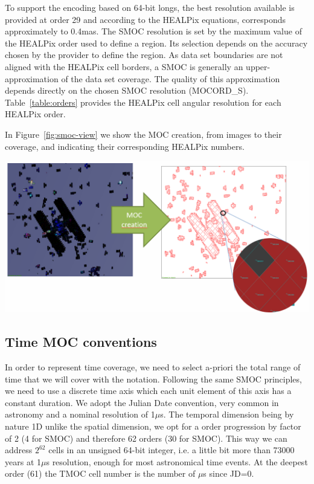 \documentclass[11pt,a4paper]{ivoa}
\begin{document}
To support the encoding based on 64-bit longs, the best resolution
available is provided at order 29 and according to the HEALPix
equations, corresponds approximately to 0.4mas.  The SMOC resolution
is set by the maximum value of the HEALPix order used to define a
region. Its selection depends on the accuracy chosen by the provider
to define the region.  As data set boundaries are not aligned with the
HEALPix cell borders, a SMOC is generally an upper-approximation of
the data set coverage. The quality of this approximation depends
directly on the chosen SMOC resolution (MOCORD\_S).
Table~\ref{table:orders} provides the HEALPix cell angular resolution for
each HEALPix order.

In Figure~\ref{fig:smoc-view} we show the MOC creation, from images to their coverage,
and indicating their corresponding HEALPix numbers. 

\begin{adjustbox}{center,caption={SMOC: from the image
      to the list of numbers based on HEALPix hierarchy tessellation},
    label={fig:smoc-view},nofloat=figure,vspace=\bigskipamount}
\includegraphics[width=\textwidth]{smoc_view.png}
\end{adjustbox}




\subsection{Time MOC conventions}
\label{sec:tmoc1}


In order to represent time coverage, we need to select a-priori the
total range of time that we will cover with the notation. Following
the same SMOC principles, we need to use a discrete time axis which
each unit element of this axis has a constant duration. We adopt
the Julian Date convention, very common in astronomy and a nominal
resolution of 1$\mu$s. The temporal dimension being by nature 1D unlike
the spatial dimension, we opt for a order progression by factor of
2 (4 for SMOC) and therefore 62 orders (30 for SMOC). This way we
can address $2^{62}$ cells in an unsigned 64-bit integer,
i.e. a little bit more than 73000 years at
1$\mu$s resolution, enough for most astronomical time events. At the
deepest order (61) the TMOC cell number is the number of $\mu$s since
JD=0.
\end{document}
